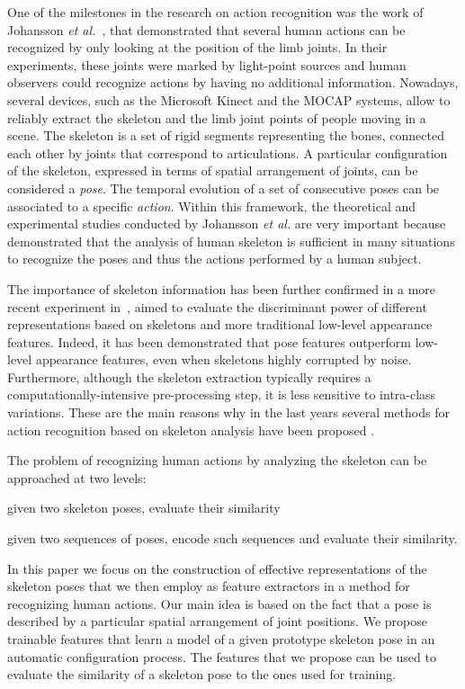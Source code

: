 \documentclass[runningheads,a4paper]{llncs}
\begin{document}
One of the milestones in the research on action recognition was the work of Johansson \emph{et al.}~\cite{Johansson73}, that demonstrated that several human actions can be recognized by only looking at the position of the limb joints. In their experiments, these joints were marked by light-point sources and human observers could recognize actions by having no additional information.
Nowadays, several devices, such as the Microsoft Kinect and the MOCAP systems, allow to reliably extract the skeleton and the limb joint points of people moving in a scene. 
The skeleton is a set of rigid segments representing the bones, connected each other by joints that correspond to articulations. A particular configuration of the skeleton, expressed in terms of spatial arrangement of joints, can be considered a \emph{pose}. The temporal evolution of a set of consecutive poses can be associated to a specific \emph{action}. 
Within this framework, the theoretical and experimental studies conducted by Johansson \emph{et al.} are very important because demonstrated that the analysis of human skeleton is sufficient in many situations to recognize the poses and thus the actions performed by a human subject.

The importance of skeleton information has been further confirmed in a more recent experiment in~\cite{Yao11}, aimed to evaluate the discriminant power of different representations based on skeletons and more traditional low-level appearance features. Indeed, it has been demonstrated that pose features outperform low-level appearance features, even when skeletons highly corrupted by noise.
Furthermore, although the skeleton extraction typically requires a computationally-intensive pre-processing step, it is less sensitive to intra-class variations.
These are the main reasons why in the last years several methods for action recognition based on skeleton analysis have been proposed \cite{Vemulapalli14,Chaudhry13,Yang14,Dias16,Dias16_2}.


The problem of recognizing human actions by analyzing the skeleton can be approached at two levels: 
\begin{inparaenum}
\item given two skeleton poses, evaluate their similarity
\item given two sequences of poses, encode such sequences and evaluate their similarity.
\end{inparaenum}

In this paper we focus on the construction of  effective representations of the skeleton poses that we then employ as feature extractors in a method for recognizing human actions. Our main idea is based on the fact that a pose is described by a particular spatial arrangement of joint positions. We propose trainable features that learn a model of a given prototype skeleton pose in an automatic configuration process. The features that we propose can be used to evaluate the similarity of a skeleton pose to the ones used for training.
\end{document}
